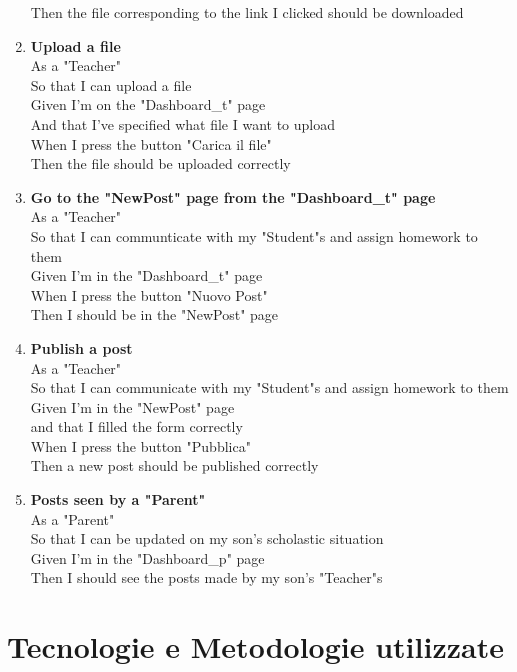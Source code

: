 \documentclass[Lau, binding=0.6cm, oneside]{sapthesis}
\begin{document}
\begin{enumerate}
			Then the file corresponding to the link I clicked should be downloaded\\
	\item \textbf{Upload a file}\\
			As a "Teacher"\\
			So that I can upload a file\\
			Given I’m on the "Dashboard\_t" page\\
			And that I’ve specified what file I want to upload\\
			When I press the button "Carica il file"\\
			Then the file should be uploaded correctly\\
	\item \textbf{Go to the "NewPost" page from the "Dashboard\_t" page}\\
			As a "Teacher"\\
			So that I can communticate with my "Student"s and assign homework to them\\
			Given I’m in the "Dashboard\_t" page\\
			When I press the button "Nuovo Post"\\
			Then I should be in the "NewPost" page\\
	\item \textbf{Publish a post}\\
			As a "Teacher"\\
			So that I can communicate with my "Student"s and assign homework to them\\
			Given I’m in the "NewPost" page\\
			and that I filled the form correctly\\
			When I press the button "Pubblica"\\
			Then a new post should be published correctly\\
	\item \textbf{Posts seen by a "Parent"}\\
			As a "Parent"\\
			So that I can be updated on my son’s scholastic situation\\
			Given I’m in the "Dashboard\_p" page\\
			Then I should see the posts made by my son’s "Teacher"s\\
\end{enumerate}

\chapter{Tecnologie e Metodologie utilizzate}
\end{document}
